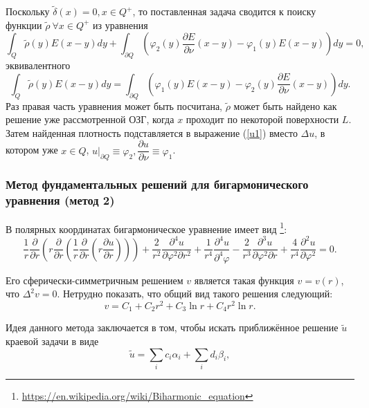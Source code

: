 \documentclass[a4paper]{article}
\newcommand{\der}[2]{\dfrac{\partial #1}{\partial #2}}
\begin{document}
Поскольку $\tilde{\delta}(x)=0, x \in Q^+$, то поставленная задача сводится к поиску функции $\tilde{\rho}\ \forall x \in Q^+$ из уравнения
\begin{equation}
  \int_Q \tilde{\rho}(y) E(x-y) dy + \int_{\partial Q} \left(\varphi_2(y)\der{E}{\nu}(x-y)-\varphi_1(y) E(x-y) \right) dy=0,
\end{equation}
эквивалентного
\begin{equation}
  \int_Q \tilde{\rho}(y) E(x-y) dy = \int_{\partial Q} \left(\varphi_1(y) E(x-y) -\varphi_2(y)\der{E}{\nu}(x-y)\right) dy.
  \label{bgogz}
\end{equation}
Раз правая часть уравнения может быть посчитана, $\tilde{\rho}$ может быть найдено как решение уже рассмотренной ОЗГ, когда $x$ проходит по некоторой поверхности $L$.
Затем найденная плотность подставляется в выражение (\ref{u1}) вместо $\Delta u$, в котором уже $x \in Q$, $u|_{\partial Q} \equiv \varphi_2, \der{u}{\nu} \equiv \varphi_1$.

\subsubsection{Метод фундаментальных решений для бигармонического уравнения (метод 2)}

В полярных координатах бигармоническое уравнение имеет вид \footnote{\url{https://en.wikipedia.org/wiki/Biharmonic_equation}}:
\begin{equation}
  \dfrac{1}{r} \dfrac{\partial}{\partial r} \left(r \dfrac{\partial}{\partial r} \left( \dfrac{1}{r} \dfrac{\partial}{\partial r} \left(r \dfrac{\partial u}{\partial r}   \right)  \right)    \right) + \dfrac{2}{r^2} \dfrac{\partial^4 u}{\partial \varphi^2 \partial r^2} +\dfrac{1}{r^4} \dfrac{\partial^4 u}{\partial^4 \varphi} - \dfrac{2}{r^3} \dfrac{\partial^3 u}{\partial \varphi^2 \partial r} + \dfrac{4}{r^4} \dfrac{\partial^2 u}{\partial \varphi^2}=0.
\end{equation}

Его сферически-симметричным решением $v$ является такая функция $v=v(r)$, что $\Delta^2 v=0$.
Нетрудно показать, что общий вид такого решения следующий:
\begin{equation*}
  v = C_1 + C_2 r^2 + C_3 \ln r + C_4 r^2 \ln r.
\end{equation*}

Идея данного метода заключается в том, чтобы искать приближённое решение $\tilde{u}$ краевой задачи в виде
\begin{equation*}
  \tilde{u} = \sum_i c_i \alpha_i + \sum_i d_i \beta_i,
\end{equation*}
\end{document}

